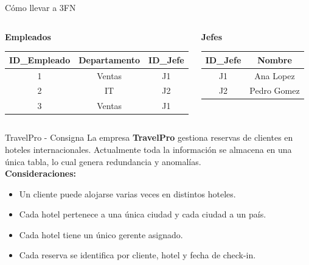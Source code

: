\documentclass{beamer}
\begin{document}
\begin{frame}{Cómo llevar a 3FN}
    \begin{columns}
            \begin{center}
            \textbf{Empleados}\\[0.1cm]
            \small
            \begin{tabular}{ccc}
                \hline
                ID\_Empleado & Departamento & ID\_Jefe \\
                \hline
                1 & Ventas & J1 \\
                2 & IT & J2 \\
                3 & Ventas & J1 \\
                \hline
            \end{tabular}
            \end{center}
            \begin{center}
            \textbf{Jefes}\\[0.1cm]
            \small
            \begin{tabular}{cc}
                \hline
                ID\_Jefe & Nombre \\
                \hline
                J1 & Ana Lopez \\
                J2 & Pedro Gomez \\
                \hline
            \end{tabular}
            \end{center}
    \end{columns}
\end{frame}

\begin{frame}{TravelPro - Consigna}
    \small
    La empresa \textbf{TravelPro} gestiona reservas de clientes en hoteles internacionales. Actualmente toda la información se almacena en una única tabla, lo cual genera redundancia y anomalías. \\
    \vspace{0.4cm}
    \textbf{Consideraciones:}
    \begin{itemize}
        \item Un cliente puede alojarse varias veces en distintos hoteles.
        \item Cada hotel pertenece a una única ciudad y cada ciudad a un país.
        \item Cada hotel tiene un único gerente asignado.
        \item Cada reserva se identifica por cliente, hotel y fecha de check-in.
    \end{itemize}
\end{frame}
\end{document}
